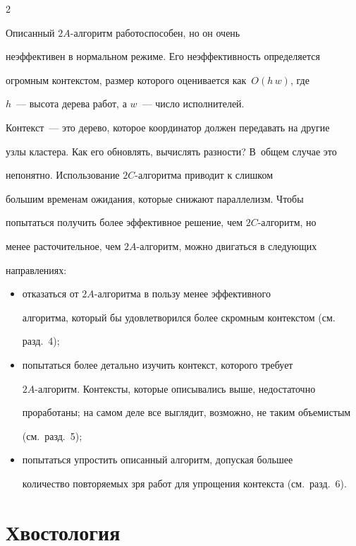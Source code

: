 \begin{multicols}{2}
      


      Описанный $2A$-ал\-го\-ритм работоспособен, но он очень 


неэффективен в нормальном режиме. Его неэффективность определяется 


огромным контекстом, размер которого оценивается как~$O(h\,w)$, где 


      $h$~--- высота дерева работ, а $w$~--- число исполнителей. 


Контекст~--- это дерево, которое координатор должен передавать на другие 


узлы кластера. Как его обновлять, вычислять разности? В~общем случае это 


непонятно. Использование $2C$-ал\-го\-рит\-ма приводит к слишком 


большим временам ожидания, которые снижают параллелизм. Чтобы 


попытаться получить более эффективное решение, чем $2C$-ал\-го\-ритм, но 


менее расточительное, чем $2A$-ал\-го\-ритм, можно двигаться в следующих 


направлениях:


      \begin{itemize}


\item отказаться от $2A$-ал\-го\-рит\-ма в пользу менее эффективного 


алгоритма, который бы удовлетворился более скромным контекстом (см.\ 


разд.~4);


\item попытаться более детально изучить контекст, которого требует 


$2A$-ал\-го\-ритм. Контексты, которые описывались выше, недостаточно 


проработаны; на самом деле все выглядит, возможно, не таким объемистым 


(см.\ разд.~5);


\item попытаться упростить описанный алгоритм, допуская большее 


количество повторяемых зря работ для упрощения контекста (см.\ разд.~6).


\end{itemize}





\section{Хвостология}



\end{multicols}
